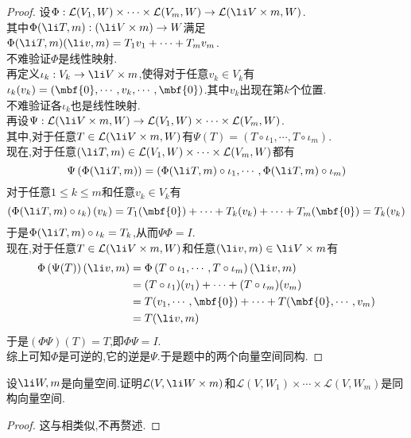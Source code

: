 \documentclass{ctexart}
\begin{document}
\begin{proof}
    设$\Phi:\mathcal{L}(V_1,W)\times\cdots\times\mathcal{L}(V_m,W)\to\mathcal{L}(\li V\times m,W)$.\\
    其中$\Phi(\li T,m):\left(\li V\times m\right)\to W$满足$\Phi(\li T,m)(\li v,m)=T_1v_1+\cdots+T_mv_m$.\\
    不难验证$\Phi$是线性映射.\\
    再定义$\iota_k:V_k\to\li V\times m$,使得对于任意$v_k\in V_k$有$\iota_k(v_k)=(\mbf{0},\cdots,v_k,\cdots,\mbf{0})$.其中$v_k$出现在第$k$个位置.\\
    不难验证各$\iota_k$也是线性映射.\\
    再设$\Psi:\mathcal{L}(\li V\times m,W)\to\mathcal{L}(V_1,W)\times\cdots\times\mathcal{L}(V_m,W)$.\\
    其中,对于任意$T\in\mathcal{L}(\li V\times m,W)$有$\Psi(T)=\left(T\circ\iota_1,\cdots,T\circ\iota_m\right)$.\\
    现在,对于任意$\left(\li T,m\right)\in\mathcal{L}(V_1,W)\times\cdots\times\mathcal{L}(V_m,W)$都有
    $$\Psi\left(\Phi(\li T,m)\right)=(\Phi(\li T,m)\circ\iota_1,\cdots,\Phi(\li T,m)\circ\iota_m)$$
    对于任意$1\leqslant k\leqslant m$和任意$v_k\in V_k$有
    $$\left(\Phi(\li T,m)\circ\iota_k\right)(v_k)=T_1(\mbf{0})+\cdots+T_k(v_k)+\cdots+T_m(\mbf{0})=T_k(v_k)$$
    于是$\Phi(\li T,m)\circ\iota_k=T_k$,从而$\Psi\Phi=I$.\\
    现在,对于任意$T\in\mathcal{L}(\li V\times m,W)$和任意$(\li v,m)\in\li V\times m$有
    $$\begin{aligned}
        \Phi\left(\Psi(T)\right)(\li v,m)
        &= \Phi\left(T\circ\iota_1,\cdots,T\circ\iota_m\right)(\li v,m) \\
        &= (T\circ\iota_1)(v_1)+\cdots+(T\circ\iota_m)(v_m) \\
        &= T(v_1,\cdots,\mbf{0})+\cdots+T(\mbf{0},\cdots,v_m) \\
        &= T(\li v,m)
    \end{aligned}$$
    于是$(\Phi\Psi)(T)=T$,即$\Phi\Psi=I$.\\
    综上可知$\Phi$是可逆的,它的逆是$\Psi$.于是题中的两个向量空间同构.
\end{proof}
\begin{problem}[4.]
    设$\li W,m$是向量空间.证明$\mathcal{L}(V,\li W\times m)$和$\mathcal{L}(V,W_1)\times\cdots\times\mathcal{L}(V,W_m)$是同构向量空间.
\end{problem}
\begin{proof}
    这与相类似,不再赘述.
\end{proof}
\end{document}
